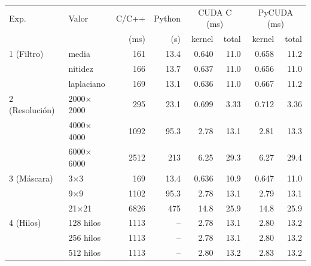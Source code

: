 \begin{tabular}{llrrrrrr}
\toprule
Exp. & Valor & C/C++ & Python & \multicolumn{2}{c}{CUDA C (ms)} & \multicolumn{2}{c}{PyCUDA (ms)} \\
 & & (ms) & (s) & kernel & total & kernel & total \\
\midrule
1 (Filtro) & media & 161 & 13.4 & 0.640 & 11.0 & 0.658 & 11.2 \\
 & nitidez & 166 & 13.7 & 0.637 & 11.0 & 0.656 & 11.0 \\
 & laplaciano & 169 & 13.1 & 0.636 & 11.0 & 0.667 & 11.2 \\
\midrule
2 (Resolución) & 2000$\times$2000 & 295 & 23.1 & 0.699 & 3.33 & 0.712 & 3.36 \\
 & 4000$\times$4000 & 1092 & 95.3 & 2.78 & 13.1 & 2.81 & 13.3 \\
 & 6000$\times$6000 & 2512 & 213 & 6.25 & 29.3 & 6.27 & 29.4 \\
\midrule
3 (Máscara) & 3$\times$3 & 169 & 13.4 & 0.636 & 10.9 & 0.647 & 11.0 \\
 & 9$\times$9 & 1102 & 95.3 & 2.78 & 13.1 & 2.79 & 13.1 \\
 & 21$\times$21 & 6826 & 475 & 14.8 & 25.9 & 14.8 & 25.9 \\
\midrule
4 (Hilos) & 128 hilos & 1113 & -- & 2.78 & 13.1 & 2.80 & 13.2 \\
 & 256 hilos & 1113 & -- & 2.78 & 13.1 & 2.80 & 13.2 \\
 & 512 hilos & 1113 & -- & 2.80 & 13.2 & 2.83 & 13.2 \\
\bottomrule
\end{tabular}
